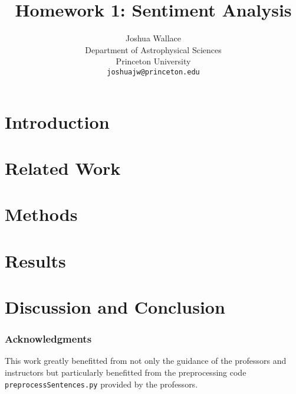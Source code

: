 \documentclass{article} %
\title{Homework 1: Sentiment Analysis}
\author{
Joshua Wallace\\
Department of Astrophysical Sciences\\
Princeton University\\
\texttt{joshuajw@princeton.edu} \\
}
\begin{document}
\maketitle

\begin{abstract}

\end{abstract}

\section{Introduction}



\section{Related Work}


\section{Methods}




\section{Results}


\section{Discussion and Conclusion}


\subsubsection*{Acknowledgments}
This work greatly benefitted from not only the guidance of the
professors and instructors but particularly benefitted from the
preprocessing code \texttt{preprocessSentences.py} provided by the
professors.




\end{document}
